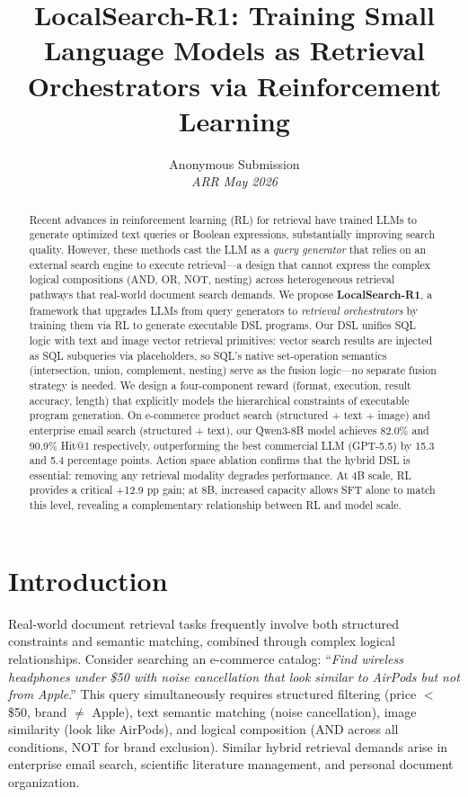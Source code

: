 \documentclass[11pt]{article}
\title{LocalSearch-R1: Training Small Language Models as Retrieval Orchestrators via Reinforcement Learning}
\author{
  Anonymous Submission \\
  \textit{ARR May 2026}
}
\begin{document}
\maketitle

\begin{abstract}
Recent advances in reinforcement learning (RL) for retrieval have trained LLMs to generate optimized text queries or Boolean expressions, substantially improving search quality.
However, these methods cast the LLM as a \emph{query generator} that relies on an external search engine to execute retrieval---a design that cannot express the complex logical compositions (AND, OR, NOT, nesting) across heterogeneous retrieval pathways that real-world document search demands.
We propose \textbf{LocalSearch-R1}, a framework that upgrades LLMs from query generators to \emph{retrieval orchestrators} by training them via RL to generate executable DSL programs.
Our DSL unifies SQL logic with text and image vector retrieval primitives: vector search results are injected as SQL subqueries via placeholders, so SQL's native set-operation semantics (intersection, union, complement, nesting) serve as the fusion logic---no separate fusion strategy is needed.
We design a four-component reward (format, execution, result accuracy, length) that explicitly models the hierarchical constraints of executable program generation.
On e-commerce product search (structured + text + image) and enterprise email search (structured + text), our Qwen3-8B model achieves 82.0\% and 90.9\% Hit@1 respectively, outperforming the best commercial LLM (GPT-5.5) by 15.3 and 5.4 percentage points.
Action space ablation confirms that the hybrid DSL is essential: removing any retrieval modality degrades performance.
At 4B scale, RL provides a critical +12.9 pp gain; at 8B, increased capacity allows SFT alone to match this level, revealing a complementary relationship between RL and model scale.
\end{abstract}

\section{Introduction}
\label{sec:intro}

Real-world document retrieval tasks frequently involve both structured constraints and semantic matching, combined through complex logical relationships.
Consider searching an e-commerce catalog: ``\emph{Find wireless headphones under \$50 with noise cancellation that look similar to AirPods but not from Apple}.''
This query simultaneously requires structured filtering (price $<$ \$50, brand $\neq$ Apple), text semantic matching (noise cancellation), image similarity (look like AirPods), and logical composition (AND across all conditions, NOT for brand exclusion).
Similar hybrid retrieval demands arise in enterprise email search, scientific literature management, and personal document organization.
\end{document}
